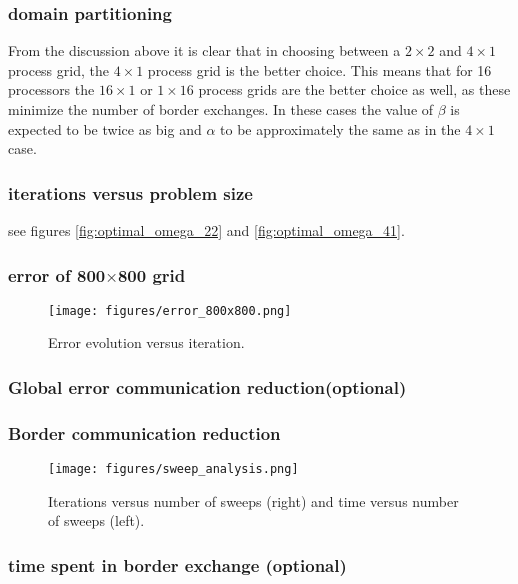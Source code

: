 \subsubsection{domain partitioning}
From the discussion above it is clear that in choosing between a $2\times2$ and $4\times1$ process grid, the $4\times1$ process grid is the better choice.
This means that for 16 processors the $16\times1$ or $1\times16$ process grids are the better choice as well, 
as these minimize the number of border exchanges. In these cases the value of $\beta$ is expected to be twice as big and $\alpha$ to be approximately the same
as in the $4\times1$ case.

\subsubsection{iterations versus problem size}
see figures \ref{fig:optimal_omega_22} and \ref{fig:optimal_omega_41}.

\subsubsection{error of 800$\times$800 grid}
\begin{figure}[H]
    \centering
    \texttt{[image: figures/error\_800x800.png]}
    \caption{Error evolution versus iteration.}
    \label{fig:error_800}
\end{figure}

\subsubsection{Global error communication reduction(optional)}

\subsubsection{Border communication reduction}
\begin{figure}[H]
    \centering
    \texttt{[image: figures/sweep\_analysis.png]}
    \caption{Iterations versus number of sweeps (right) and time versus number of sweeps (left).}
    \label{fig:sweep_analysis}
\end{figure}

\subsubsection{time spent in border exchange (optional)} 

